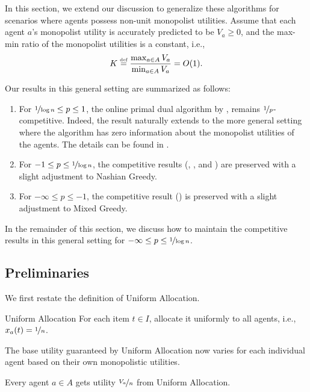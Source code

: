 \documentclass[11pt,letterpaper]{article}
\newcommand{\defeq}{\stackrel{\textrm{\tiny def}}{=}}
\begin{document}
In this section, we extend our discussion to generalize these algorithms for scenarios where agents possess non-unit monopolist utilities. Assume that each agent $a$'s monopolist utility is accurately predicted to be $V_a\geq 0$, and the max-min ratio of the monopolist utilities is a constant, i.e.,
\[K \defeq \frac{\max_{a\in A} V_a}{\min_{a\in A} V_a}=O(1).\]

Our results in this general setting are summarized as follows:

\begin{enumerate}
	\item For $\nicefrac{1}{\log n}\le p\le 1$, the online primal dual algorithm by \citet{DevanurJ:STOC:2012}, remains $\nicefrac{1}{p}$-competitive. Indeed, the result naturally extends to the more general setting where the algorithm has zero information about the monopolist utilities of the agents. The details can be found in .
	
	\item For $-1\le p\le \nicefrac{1}{\log n}$, the competitive results (, , and ) are preserved with a slight adjustment to Nashian Greedy.
	
	\item For $-\infty\le p\le -1$, the competitive result () is preserved with a slight adjustment to Mixed Greedy.
\end{enumerate}

In the remainder of this section, we discuss how to maintain the competitive results in this general setting for $-\infty \leq p \leq \nicefrac{1}{\log n}$.


\subsection{Preliminaries}

We first restate the definition of Uniform Allocation.

\begin{algorithm}{Uniform Allocation}
	For each item $t \in I$, allocate it uniformly to all agents, i.e., $x_a(t) = \nicefrac{1}{n}$.
\end{algorithm}

The base utility guaranteed by Uniform Allocation now varies for each individual agent based on their own monopolistic utilities.

\begin{lemma}
	\label{lem:unif-app}
	Every agent $a \in A$ gets utility $\nicefrac{V_a}{n}$ from Uniform Allocation.
\end{lemma}
\end{document}
